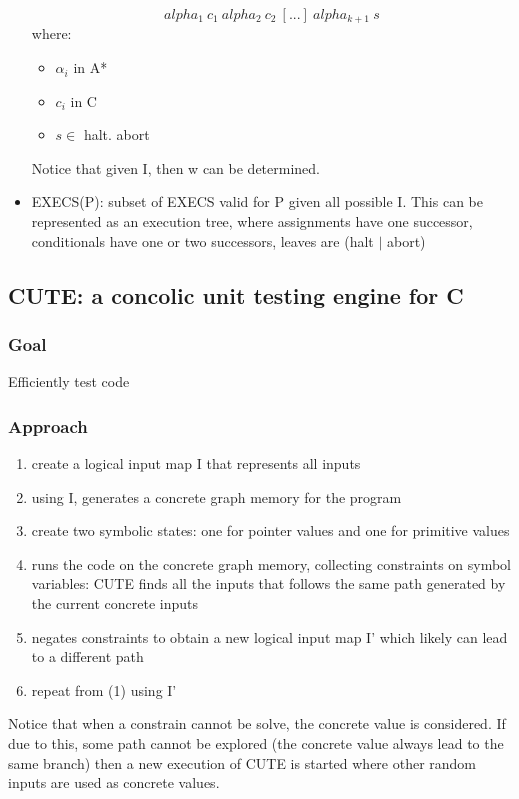 \documentclass[10pt, a4paper]{article}
\begin{document}
\begin{itemize}
    \[ alpha_1~c_1~alpha_2~c_2~[...]~alpha_{k+1}~s \]
    where:
      \begin{itemize}
        \item $\alpha_i$ in A*
        \item $c_i$ in C
        \item $s \in$ {halt. abort}
      \end{itemize}
      Notice that given I, then w can be determined.
    \item EXECS(P): subset of EXECS valid for P given all possible I. This can be represented as an execution tree, where assignments have one successor, conditionals have one or two successors, leaves are (halt $|$ abort)

\end{itemize}

\subsection{\cite{CUTE-FSE13} CUTE: a concolic unit testing engine for C} 

\subsubsection{Goal}
Efficiently test code

\subsubsection{Approach}

\begin{enumerate}
  \item create a logical input map I that represents all inputs
  \item using I, generates a concrete graph memory for the program
  \item create two symbolic states: one for pointer values and one for primitive values
  \item runs the code on the concrete graph memory, collecting constraints on symbol variables: CUTE finds all the inputs that follows the same path generated by the current concrete inputs
  \item negates constraints to obtain a new logical input map I' which likely can lead to a different path
  \item repeat from (1) using I'
\end{enumerate}


Notice that when a constrain cannot be solve, the concrete value is considered. If due to this, some path cannot be explored (the concrete value always lead to the same branch) then a new execution of CUTE is started where other random inputs are used as concrete values.
\end{document}
